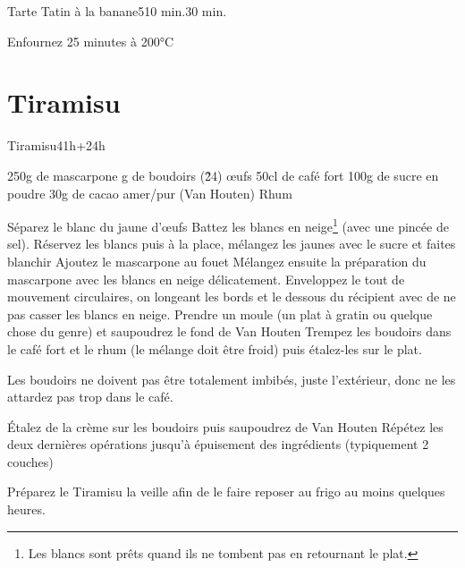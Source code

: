 {\begin{recette}{Tarte Tatin à la banane}{5}{10 min.}{30 min.}
\begin{cuisson}
Enfournez 25 minutes à 200°C
\end{cuisson}
\end{recette}

\section{Tiramisu}
\begin{recette}{Tiramisu}{4}{1h+24h}{}
\begin{ingredients}
\ingredient 250g de mascarpone
 g de boudoirs (\~ 24)
 œufs
\ingredient 50cl de café fort
\ingredient 100g de sucre en poudre
\ingredient 30g de cacao amer/pur (Van Houten)
\ingredient Rhum
\end{ingredients}

\begin{preparation}
\etape Séparez le blanc du jaune d'œufs
\etape Battez les blancs en neige\footnote{Les 
blancs sont prêts quand ils ne tombent pas en retournant le plat.} (avec une pincée de sel).
\etape Réservez les blancs puis à la place, mélangez les jaunes avec le sucre et faites blanchir
\etape Ajoutez le mascarpone au fouet
\etape Mélangez ensuite la préparation du mascarpone avec les blancs en neige délicatement. Enveloppez le tout de mouvement 
circulaires, on longeant les bords et le dessous du récipient avec de ne pas casser les blancs en neige.
\etape Prendre un moule (un plat à gratin ou quelque chose du genre) et saupoudrez le fond de Van Houten
\etape Trempez les boudoirs dans le café fort et le rhum (le mélange doit être froid) puis étalez-les sur le plat.
\begin{remarque}
Les boudoirs ne doivent pas être totalement imbibés, juste l'extérieur, donc ne les attardez pas trop dans le café.
\end{remarque}
\etape Étalez de la crème sur les boudoirs puis saupoudrez de Van Houten
\etape Répétez les deux dernières opérations jusqu'à épuisement des ingrédients (typiquement 2 couches)
\end{preparation}

\begin{remarque}
Préparez le Tiramisu la veille afin de le faire reposer au frigo au moins quelques heures.
\end{remarque}
\end{recette}

}
